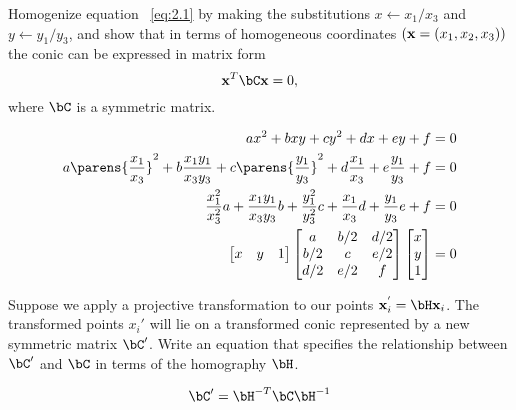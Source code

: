 \begin{problem}
\begin{enumalph}
    \newpage
    \item Homogenize equation ~\ref{eq:2.1} by making the
      substitutions $x \gets x_1/x_3$ and $y \gets y_1/y_3$,
      and show that in terms of homogeneous coordinates
      $(\mathbf{x} = (x_1, x_2, x_3))$ the conic can be expressed in
      matrix form
      \[ \bx^T\bC\bx = 0, \]
      where $\bC$ is a symmetric matrix.
      \begin{Answer}
        \begin{align*}
          ax^2 + bxy + cy^2 + dx + ey + f &= 0 \\
          a\parens{\frac{x_1}{x_3}}^2 + b\frac{x_1y_1}{x_3y_3}
          + c\parens{\frac{y_1}{y_3}}^2
          + d\frac{x_1}{x_3} + e\frac{y_1}{y_3} + f &= 0 \\
          \frac{x_1^2}{x_3^2}a + \frac{x_1y_1}{x_3y_3}b
          + \frac{y_1^2}{y_3^2}c
          + \frac{x_1}{x_3}d + \frac{y_1}{y_3}e + f &= 0 \\
          \begin{bmatrix}
            x & y & 1 \\
          \end{bmatrix}
          \begin{bmatrix}
            a & b/2 & d/2 \\
            b/2 & c & e/2 \\
            d/2 & e/2 & f \\
          \end{bmatrix}
          \begin{bmatrix}
            x \\
            y \\
            1 \\
          \end{bmatrix}
          &= 0
        \end{align*}
      \end{Answer}

    \item Suppose we apply a projective transformation to our
      points $\bx_i^{'} = \bH\bx_i$.
      The transformed points $x_i'$ will lie on a transformed
      conic represented by a new symmetric matrix $\bC'$.
      Write an equation that specifies the relationship between
      $\bC'$ and $\bC$ in terms of the homography $\bH$.
      \begin{Answer}
        \[ \bC' = \bH^{-T} \bC \bH^{-1} \]
      \end{Answer}
  \end{enumalph}
\end{problem}

